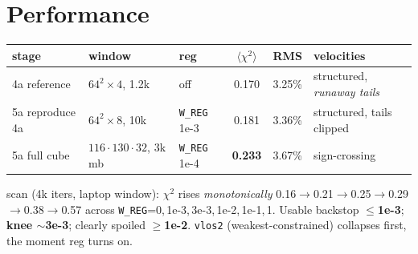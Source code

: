 \documentclass[10pt,a4paper]{article}
\newcommand{\co}[1]{{\small\texttt{#1}}}
\begin{document}
\section{Performance}
\begin{center}\footnotesize\setlength{\tabcolsep}{4.5pt}
\begin{tabular}{lllccl}
\hline
stage & window & reg & $\langle\chi^2\rangle$ & RMS & velocities\\
\hline
4a reference        & $64^2{\times}4$, 1.2k   & off        & 0.170 & 3.25\% & structured, \emph{runaway tails}\\
5a reproduce 4a     & $64^2{\times}8$, 10k    & \co{W\_REG}\,1e-3 & 0.181 & 3.36\% & structured, tails clipped\\
5a full cube        & $116{\cdot}130{\cdot}32$, 3k mb & \co{W\_REG}\,1e-4 & \textbf{0.233} & 3.67\% & sign-crossing\\
\hline
\end{tabular}
\end{center}
\vspace{-2pt}
{\footnotesize\color{gry}\co{W\_REG} scan (4k iters, laptop window): $\chi^2$ rises \emph{monotonically} 0.16$\to$0.21$\to$0.25$\to$0.29$\to$0.38$\to$0.57 across \co{W\_REG}=0,\,1e-3,\,3e-3,\,1e-2,\,1e-1,\,1. Usable backstop \textbf{$\le$1e-3}; \textbf{knee $\sim$3e-3}; clearly spoiled \textbf{$\ge$1e-2}. \co{vlos2} (weakest-constrained) collapses first, the moment reg turns on.}

\end{document}
